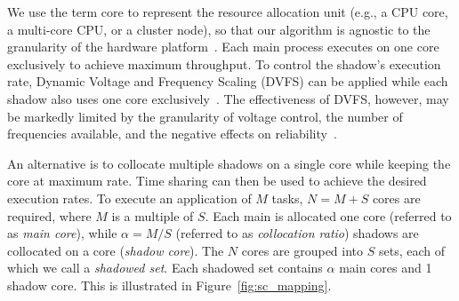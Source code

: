 We use the term core to represent the resource allocation unit (e.g., a
CPU core, a multi-core CPU, or a cluster node), so that our algorithm is agnostic to the
granularity of the hardware platform~\cite{casanova_inria_2012}. Each main process executes on one core exclusively to achieve maximum throughput.  
To control the shadow's execution rate, Dynamic Voltage and Frequency Scaling (DVFS) can be applied while each shadow also uses one core exclusively~\cite{mills_2014_icnc,cui_en7085151,cui_2014_closer}. 
The effectiveness of DVFS, however, may be markedly 
limited by the granularity of voltage control, the number of frequencies available, and the negative effects on 
reliability~\cite{chandra2008defect}.


An alternative is to collocate multiple shadows on a single core while keeping the core at maximum rate. Time sharing can then be used to achieve the desired execution rates.
To execute an application of $M$ tasks, $N=M+S$ cores are required, where $M$ is a multiple of $S$. Each main is allocated one core (referred to as \textit{main core}), while $\alpha=M/S$ (referred to as \textit{collocation ratio}) shadows are collocated on a core (\textit{shadow core}). 
The $N$ cores are grouped into $S$ sets, each of which we call a \textit{shadowed set}. Each shadowed set contains $\alpha$ main cores and 1 shadow core.
This is illustrated in Figure~\ref{fig:sc_mapping}.  

